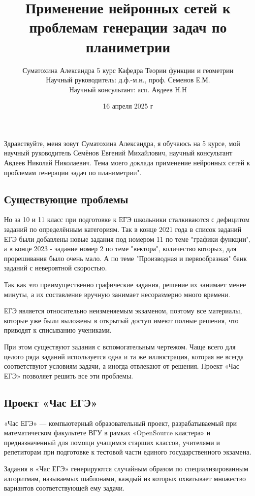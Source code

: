 \documentclass[a4paper, 12pt]{extarticle}
\title{Применение нейронных сетей к проблемам генерации
задач по планиметрии}
\author{Суматохина Александра 5 курс Кафедра Теории функции и геометрии\\Научный руководитель: д.ф.-м.н., проф. Семенов Е.М.\\Научный консультант: асп. Авдеев Н.Н}
\date{16 апреля 2025 г}
\begin{document}
\maketitle

Здравствуйте, меня зовут Суматохина Александра, я обучаюсь на 5 курсе, мой научный руководитель Семёнов Евгений Михайлович, научный консультант Авдеев Николай Николаевич. Тема моего доклада применение нейронных сетей к проблемам генерации
задач по планиметрии".

\subsection*{Существующие проблемы}
Но за 10 и 11 класс при подготовке к ЕГЭ школьники сталкиваются с дефицитом заданий по определённым категориям.
Так в конце 2021 года в список заданий ЕГЭ были добавлены новые задания под номером 11 по теме "графики функции", а в конце 2023 - задание номер 2 по теме "вектора", количество которых, для прорешивания было очень мало. 
А по теме "Производная и первообразная" банк заданий с невероятной скоростью.

Так как это преимущественно графические задания, решение их занимает менее минуты, а их составление вручную занимает несоразмерно много времени.

ЕГЭ является относительно неизменяемым экзаменом, поэтому все материалы, которые уже были выложены в открытый доступ имеют полные решения, что приводят к списыванию учениками.

При этом существуют задания с вспомогательным чертежом. Чаще всего для целого ряда заданий используется одна и та же иллюстрация, которая не всегда соответствуют условиям задачи, а иногда отвлекают от решения.
Проект «Час ЕГЭ» позволяет решить все эти проблемы.

\subsection*{Проект «Час ЕГЭ»}
«Час ЕГЭ» — компьютерный образовательный проект, разрабатываемый при математическом
факультете ВГУ в рамках «OpenSource кластера» и предназначенный для помощи учащимся
старших классов, учителями и репетиторам при подготовке к тестовой части единого государственного экзамена.

Задания в «Час ЕГЭ» генерируются случайным образом по специализированным алгоритмам, называемых шаблонами, каждый из которых охватывает множество вариантов соответствующей ему задачи.
\end{document}
